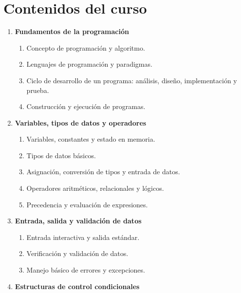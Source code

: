 \section{Contenidos del curso}

\begin{enumerate}

  \item \textbf{Fundamentos de la programación}

  \begin{enumerate}
    \item \label{itm:1.1} Concepto de programación y algoritmo.
    \item \label{itm:1.2} Lenguajes de programación y paradigmas.
    \item \label{itm:1.3} Ciclo de desarrollo de un programa: análisis, diseño, implementación y prueba.
    \item \label{itm:1.4} Construcción y ejecución de programas.
  \end{enumerate}

  \item \textbf{Variables, tipos de datos y operadores}

  \begin{enumerate}
    \item \label{itm:2.1} Variables, constantes y estado en memoria.
    \item \label{itm:2.2} Tipos de datos básicos.
    \item \label{itm:2.3} Asignación, conversión de tipos y entrada de datos.
    \item \label{itm:2.4} Operadores aritméticos, relacionales y lógicos.
    \item \label{itm:2.5} Precedencia y evaluación de expresiones.
  \end{enumerate}

  \item \textbf{Entrada, salida y validación de datos}

  \begin{enumerate}
    \item \label{itm:3.1} Entrada interactiva y salida estándar.
    \item \label{itm:3.2} Verificación y validación de datos.
    \item \label{itm:3.3} Manejo básico de errores y excepciones.
  \end{enumerate}

  \item \textbf{Estructuras de control condicionales}


\end{enumerate}
